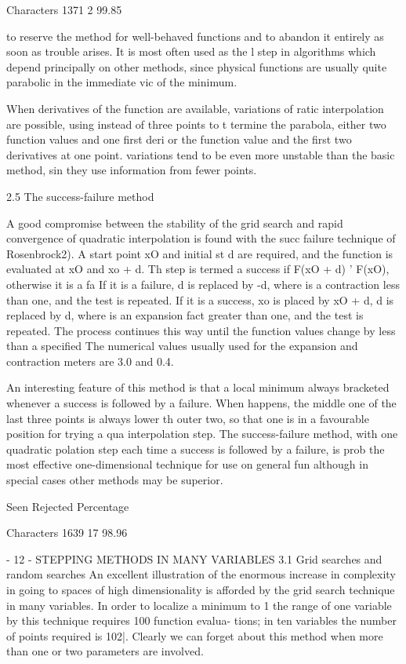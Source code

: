 Characters       1371        2   99.85
 
 
to reserve the method for well-behaved functions and to abandon it
entirely as soon as trouble arises.  It is most often used as the l
step in algorithms which depend principally on other methods, since
physical functions are usually quite parabolic in the immediate vic
of the minimum.
 
     When derivatives of the function are available, variations of 
ratic interpolation are possible, using instead of three points to t
termine the parabola, either two function values and one first deri
or the function value and the first two derivatives at one point.
variations tend to be even more unstable than the basic method, sin
they use information from fewer points.
 
 
2.5  The success-failure method
 
     A good compromise between the stability of the grid search and
rapid convergence of quadratic interpolation is found with the succ
failure technique of Rosenbrock2).  A start point xO and initial st
d are required, and the function is evaluated at xO and xo + d.  Th
step is termed a success if F(xO + d) ' F(xO), otherwise it is a fa
If it is a failure, d is replaced by -d, where  is a contraction
less than one, and the test is repeated.  If it is a success, xo is
placed by xO + d, d is replaced by d, where  is an expansion fact
greater than one, and the test is repeated.  The process continues
this way until the function values change by less than a specified
The numerical values usually used for the expansion and contraction
meters are   3.0 and   0.4.
 
     An interesting feature of this method is that a local minimum
always bracketed whenever a success is followed by a failure.  When
happens, the middle one of the last three points is always lower th
outer two, so that one is in a favourable position for trying a qua
interpolation step.  The success-failure method, with one quadratic
polation step each time a success is followed by a failure, is prob
the most effective one-dimensional technique for use on general fun
although in special cases other methods may be superior.
 
                 Seen Rejected  Percentage
 
Characters       1639       17   98.96
 
                                     - 12 -
   STEPPING METHODS IN MANY VARIABLES
   3.1  Grid searches and random searches
        An excellent illustration of the enormous increase in complexity in
   going to spaces of high dimensionality is afforded by the grid search
   technique in many variables.  In order to localize a minimum to 1%
   the range of one variable by this technique requires 100 function evalua-
   tions;  in ten variables the number of points required is 102|.  Clearly
   we can forget about this method when more than one or two parameters are
   involved.
 
